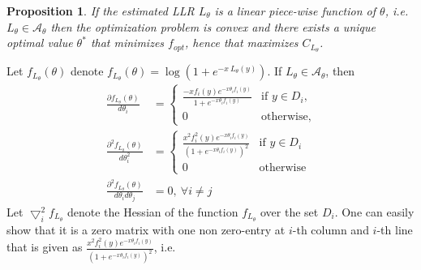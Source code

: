 \documentclass[a4paper]{IEEEtran}
\newtheorem{proposition}{Proposition}
\begin{document}
  

  
  
\begin{proposition}
  If the estimated LLR $L_\theta$ is a linear piece-wise function of $\theta$, i.e. $L_{\theta}\in \mathcal{A}_{\theta}$ then the optimization problem is convex and there exists a unique optimal value $\theta^*$ that minimizes $f_{opt}$, hence that maximizes $C_{L_\theta}$.
\end{proposition}

\begin{IEEEproof}
Let $f_{L_\theta}(\theta)$ denote $f_{L_\theta}(\theta)=\log\left(1+e^{-x\:L_\theta(y)} \right)$.
  If $L_\theta\in\mathcal{A}_\theta$, then
  \begin{align}
    \frac{\partial f_{L_\theta}(\theta)}{d\theta_i}
    &= \begin{cases}
      \frac{-x f_i(y)e^{-x\theta_i f_i(y)}}{1+e^{-x\theta_if_i(y)}}
        &\text{if $y\in D_i$,}\\
      0 &\text{otherwise,}
    \end{cases}\\
    \frac{\partial^2 f_{L_\theta}(\theta)}{d\theta_i^2}
    &= \begin{cases}
      \frac{x^2 f_i^2(y)e^{-x\theta_i
          f_i(y)}}{\left(1+e^{-x\theta_if_i(y)}\right)^2}
        &\text{if $y\in D_i$}\\
      0 &\text{otherwise}
    \end{cases}\\
    \frac{\partial^2 f_{L_\theta}(\theta)}{d\theta_i d\theta_j}&=0, \ \forall i\neq j
  \end{align}
  Let $\bigtriangledown^2_if_{L_\theta}$ denote the Hessian of the function $f_{L_\theta}$ over the set $D_i$. One can easily show that it is a zero matrix with one non   zero-entry at $i$-th column and $i$-th line that is given as $\frac{x^2 f_i^2(y)e^{-x\theta_i       f_i(y)}}{\left(1+e^{-x\theta_if_i(y)}\right)^2}$, i.e. 
\end{IEEEproof}
\end{document}
